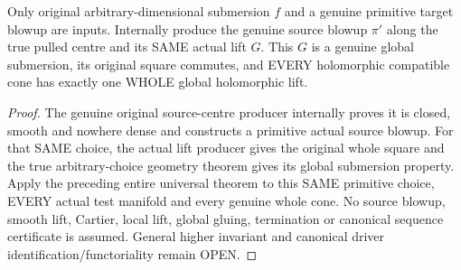 \begin{theorem}
\label{hir:submersion-blowup-cartesian-original-construction}
\leanok
{}
Only original arbitrary-dimensional submersion $f$ and a genuine primitive
target blowup are inputs. Internally produce the genuine source blowup
$\pi'$ along the true pulled centre and its SAME actual lift $G$. This $G$
is a genuine global submersion, its original square commutes, and EVERY
holomorphic compatible cone has exactly one WHOLE global holomorphic lift.
\end{theorem}
\begin{proof}
The genuine original source-centre producer internally proves it is closed,
smooth and nowhere dense and constructs a primitive actual source blowup.
For that SAME choice, the actual lift producer gives the original whole
square and the true arbitrary-choice geometry theorem gives its global
submersion property. Apply the preceding entire universal theorem to this
SAME primitive choice, EVERY actual test manifold and every genuine whole
cone. No source blowup, smooth lift, Cartier, local lift, global gluing,
termination or canonical sequence certificate is assumed. General higher
invariant and canonical driver identification/functoriality remain OPEN.
\end{proof}
